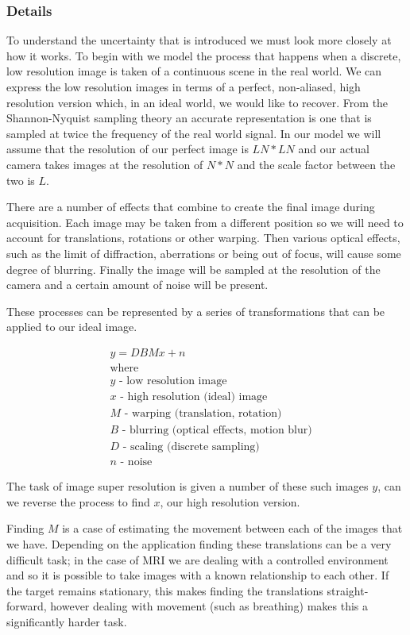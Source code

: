 \documentclass[
  oneside,
  11pt, a4paper,
  footinclude=true,
  headinclude=true,
  cleardoublepage=empty
]{scrbook}
\begin{document}
\subsubsection*{Details}
To understand the uncertainty that is introduced we must look more closely at how it works.
To begin with we model the process that happens when a discrete, low resolution image is taken of a continuous scene in the real world. We can express the low resolution images in terms of a perfect, non-aliased, high resolution version which, in an ideal world, we would like to recover. From the Shannon-Nyquist sampling theory an accurate representation is one that is sampled at twice the frequency of the real world signal\cite{shannonnyquist}. In our model we will assume that the resolution of our perfect image is $LN * LN$ and our actual camera takes images at the resolution of $N * N$ and the scale factor between the two is $L$.

There are a number of effects that combine to create the final image during acquisition. Each image may be taken from a different position so we will need to account for translations, rotations or other warping. Then various optical effects, such as the limit of diffraction, aberrations or being out of focus, will cause some degree of blurring. Finally the image will be sampled at the resolution of the camera and a certain amount of noise will be present.

These processes can be represented by a series of transformations that can be applied to our ideal image.

\begin{align*} 
& y = DBMx + n \nonumber \\ 
& \text{where} \\
& y \text{ - low resolution image} \nonumber \\
& x \text{ - high resolution (ideal) image} \nonumber \\
& M \text{ - warping (translation, rotation)} \nonumber \\
& B \text{ - blurring (optical effects, motion blur)} \nonumber \\
& D \text{ - scaling (discrete sampling)} \nonumber \\
& n \text{ - noise} \nonumber
\end{align*}

The task of image super resolution is given a number of these such images $y$, can we reverse the process to find $x$, our high resolution version.

Finding $M$ is a case of estimating the movement between each of the images that we have. Depending on the application finding these translations can be a very difficult task; in the case of MRI we are dealing with a controlled environment and so it is possible to take images with a known relationship to each other. If the target remains stationary, this makes finding the translations straight-forward, however dealing with movement (such as breathing) makes this a significantly harder task.
\end{document}
